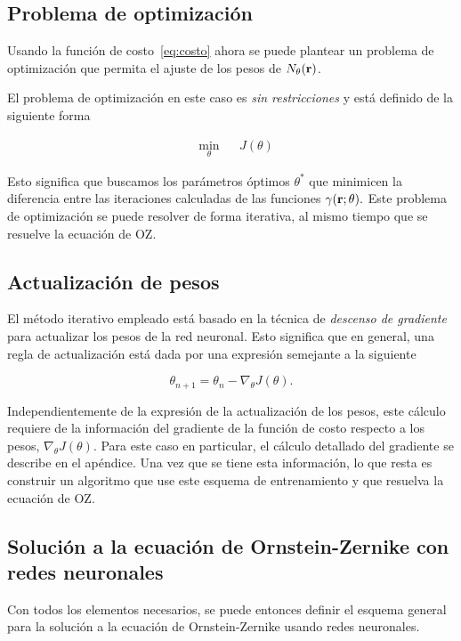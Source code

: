 \subsection{Problema de optimización}
Usando la función de costo~\eqref{eq:costo} ahora se puede plantear un problema de optimización
que permita el ajuste de los pesos de $N_{\theta}(\mathbf{r})$.

El problema de optimización en este caso es \emph{sin restricciones} y está
definido de la siguiente forma

\begin{equation}
    \begin{aligned}
         & \underset{\theta}{\text{min}}
         & & J(\theta)
    \end{aligned}
    \label{eq:optimizacion}
\end{equation}

Esto significa que buscamos los parámetros óptimos $\theta^*$ que minimicen la diferencia
entre las iteraciones calculadas de las funciones $\gamma(\mathbf{r}; \theta).$
Este problema de optimización se puede resolver de forma iterativa, al mismo tiempo que
se resuelve la ecuación de OZ.

\subsection{Actualización de pesos}
El método iterativo empleado está basado en la técnica de \emph{descenso de gradiente}
para actualizar los pesos de la red neuronal.
Esto significa que en general, una regla de actualización está dada por una expresión
semejante a la siguiente

\begin{equation}
    \theta_{n+1} = \theta_n - \nabla_{\theta} J(\theta) .
    \label{eq:gradiente}
\end{equation}

Independientemente de la expresión de la actualización de los pesos, este cálculo
requiere de la información del gradiente de la función de costo respecto a los pesos,
$\nabla_{\theta} J(\theta)$.
Para este caso en particular, el cálculo detallado del gradiente se describe en el apéndice.
Una vez que se tiene esta información, lo que resta es construir un algoritmo que use
este esquema de entrenamiento y que resuelva la ecuación de OZ.

\subsection{Solución a la ecuación de Ornstein-Zernike con redes neuronales}
Con todos los elementos necesarios, se puede entonces definir el esquema general para
la solución a la ecuación de Ornstein-Zernike usando redes neuronales.

